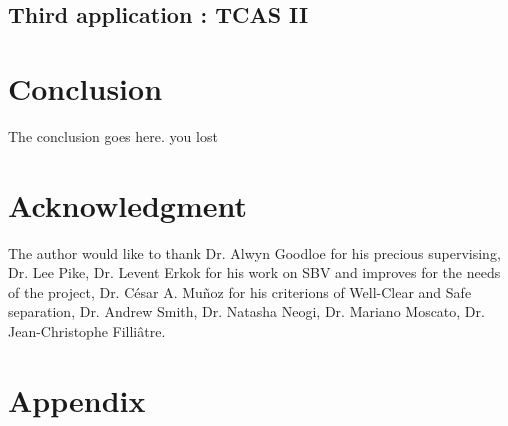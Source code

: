 \documentclass[a4paper,11pt,final]{article}
\begin{document}
	\subsection{Third application : TCAS II}
	
	\section*{Conclusion}
	The conclusion goes here.
	you lost 
	
	
	\cleardoublepage{}
	
	
	
	
	\section*{Acknowledgment}
	
	The author would like to thank Dr. Alwyn Goodloe for his precious supervising, Dr. Lee Pike, Dr. Levent Erkok for his work on SBV and improves for the needs of the project, Dr. César A. Muñoz for his criterions of Well-Clear and Safe separation, Dr. Andrew Smith, Dr. Natasha Neogi, Dr. Mariano Moscato, Dr. Jean-Christophe Filliâtre.
	
	
	\section*{Appendix}
	
\end{document}
